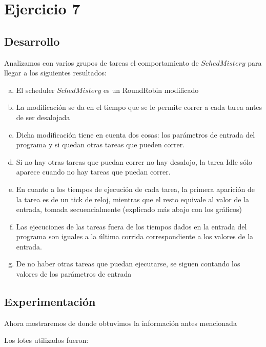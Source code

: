 \section{Ejercicio 7}
\subsection{Desarrollo}
Analizamos con varios grupos de tareas el comportamiento de $SchedMistery$ para llegar a los siguientes resultados:

\begin{enumerate}[(a)]

\item El scheduler $SchedMistery$ es un RoundRobin modificado

\item La modificación se da en el tiempo que se le permite correr a cada tarea antes de ser desalojada

\item Dicha modificación tiene en cuenta dos cosas: los parámetros de entrada del programa y si quedan otras tareas que pueden correr.

\item Si no hay otras tareas que puedan correr no hay desalojo, la tarea Idle sólo aparece cuando no hay tareas que puedan correr.

\item En cuanto a los tiempos de ejecución de cada tarea, la primera aparición de la tarea es de un tick de reloj, mientras que el resto equivale al valor de la entrada, tomada secuencialmente (explicado más abajo con los gráficos)

\item Las ejecuciones de las tareas fuera de los tiempos dados en la entrada del programa son iguales a la última corrida correspondiente a los valores de la entrada.

\item De no haber otras tareas que puedan ejecutarse, se siguen contando los valores de los parámetros de entrada

\end{enumerate}

\subsection{Experimentación}

Ahora mostraremos de donde obtuvimos la información antes mencionada

Los lotes utilizados fueron:\\

